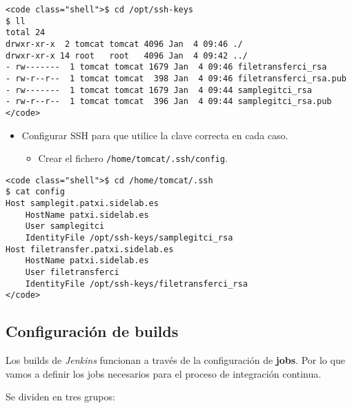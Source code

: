 \begin{quote}

\end{quote}
\begin{verbatim}
<code class="shell">$ cd /opt/ssh-keys
$ ll
total 24
drwxr-xr-x  2 tomcat tomcat 4096 Jan  4 09:46 ./
drwxr-xr-x 14 root   root   4096 Jan  4 09:42 ../
- rw-------  1 tomcat tomcat 1679 Jan  4 09:46 filetransferci_rsa
- rw-r--r--  1 tomcat tomcat  398 Jan  4 09:46 filetransferci_rsa.pub
- rw-------  1 tomcat tomcat 1679 Jan  4 09:44 samplegitci_rsa
- rw-r--r--  1 tomcat tomcat  396 Jan  4 09:44 samplegitci_rsa.pub
</code>
\end{verbatim}
\begin{itemize}
\item
  Configurar SSH para que utilice la clave correcta en cada caso.
  \begin{itemize}
  \item
    Crear el fichero \texttt{/home/tomcat/.ssh/config}.
  \end{itemize}
\end{itemize}
\begin{quote}

\end{quote}
\begin{verbatim}
<code class="shell">$ cd /home/tomcat/.ssh
$ cat config
Host samplegit.patxi.sidelab.es
    HostName patxi.sidelab.es
    User samplegitci
    IdentityFile /opt/ssh-keys/samplegitci_rsa
Host filetransfer.patxi.sidelab.es
    HostName patxi.sidelab.es
    User filetransferci
    IdentityFile /opt/ssh-keys/filetransferci_rsa
</code>
\end{verbatim}
\subsection{Configuración de builds}

Los builds de \emph{Jenkins} funcionan a través de la configuración de
\textbf{jobs}. Por lo que vamos a definir los jobs necesarios para el
proceso de integración continua.

Se dividen en tres grupos:

